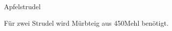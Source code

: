 \begin{recipe}{Apfelstrudel}

    \begin{ingredients}
    \end{ingredients}

    \begin{instructions}
        Für zwei Strudel wird Mürbteig aus 450\gram Mehl benötigt.
    \end{instructions}
\end{recipe}
